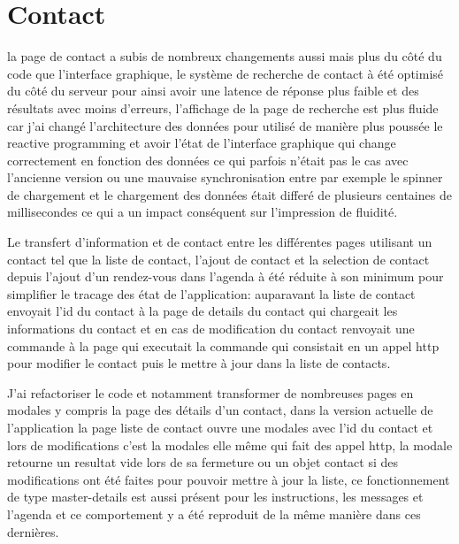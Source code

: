 \section{Contact}

la page de contact a subis de nombreux changements aussi mais plus du côté du code 
que l'interface graphique, le système de recherche de contact à été optimisé du côté 
du serveur pour ainsi avoir une latence de réponse plus faible et des résultats 
avec moins d'erreurs, l'affichage de la page de recherche est plus fluide car j'ai 
changé l'architecture des données pour utilisé de manière plus poussée le reactive 
programming et avoir l'état de l'interface graphique qui change correctement en 
fonction des données ce qui parfois n'était pas le cas avec l'ancienne version 
ou une mauvaise synchronisation entre par exemple le spinner de chargement 
et le chargement des données était differé de plusieurs centaines de millisecondes 
ce qui a un impact conséquent sur l'impression de fluidité. \newline

Le transfert d'information et de contact entre les différentes pages utilisant un contact tel
que la liste de contact, l'ajout de contact et la selection de contact depuis l'ajout 
d'un rendez-vous dans l'agenda à été réduite à son minimum pour simplifier le tracage 
des état de l'application: auparavant la liste de contact envoyait l'id du contact 	
à la page de details du contact qui chargeait les informations du contact et en cas de modification 
du contact renvoyait une commande à la page qui executait la commande qui consistait 
en un appel http pour modifier le contact puis le mettre à jour dans la liste de contacts.
\newline

J'ai refactoriser le code et notamment transformer de nombreuses pages en modales y compris la page
des détails d'un contact, dans la version actuelle de l'application la page liste de contact 
ouvre une modales avec l'id du contact et lors de modifications c'est la modales 
elle même qui fait des appel http, la modale retourne un resultat vide lors de sa fermeture 
ou un objet contact si des modifications ont été faites pour pouvoir mettre à jour la liste, 
ce fonctionnement de type master-details est aussi présent pour les instructions, les messages 
et l'agenda et ce comportement y a été reproduit de la même manière dans ces dernières. 





